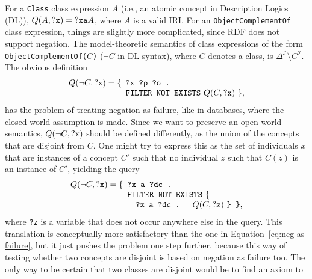 \documentclass[conference]{IEEEtran}
\begin{document}
For a \texttt{Class} class expression $A$ (i.e., an atomic concept in Description Logics (DL)), $Q(A, \mbox{\tt ?x}) = \mbox{\tt ?x a }A$,
where $A$ is a valid IRI.
For an \texttt{ObjectComplementOf} class expression, things are slightly more complicated, since RDF does not support
negation. The model-theoretic semantics of class expressions of the form \texttt{ObjectComplementOf(}$C$\texttt{)}
($\neg C$ in DL syntax), where $C$ denotes a class, is $\Delta^\mathcal{I} \setminus C^\mathcal{I}$.
The obvious definition
\begin{equation}\label{eq:neg-as-failure}
  Q(\neg C, \mbox{\tt ?x}) = 
  \begin{minipage}[t]{3in}
    \begin{tabbing}
      \quad\=\quad\=\quad\=\kill
      \{\>\texttt{?x ?p ?o .}\\
        \>\texttt{FILTER NOT EXISTS} $Q(C, \mbox{\tt ?x})$ \},
    \end{tabbing}
  \end{minipage}
\end{equation}
has the problem of treating negation as failure, like in databases,
where the closed-world assumption is made. 
Since we want to preserve an open-world semantics, $Q(\neg C, \mbox{\tt ?x})$ should be defined
differently, as the union of the concepts that are disjoint from $C$.
One might try to express this as the set of individuals $x$ that are instances of a
concept $C'$ such that no individual $z$ such that $C(z)$ is an instance of $C'$,
yielding the query
\begin{equation}\label{eq:approx-open-world-negation}
  Q(\neg C, \mbox{\tt ?x}) =
  \begin{minipage}[t]{3in}
    \begin{tabbing}
      \quad\=\quad\=\quad\=\kill
      \{\>\texttt{?x a ?dc .}\\
        \>\texttt{FILTER NOT EXISTS} \{\\
        \>\>\texttt{?z a ?dc . } $Q(C, \mbox{\tt ?z})$ \texttt{\} \}},
    \end{tabbing}
  \end{minipage}
\end{equation}
where \texttt{?z} is a variable that does not occur anywhere else in the query.
This translation is conceptually more satisfactory than the one in Equation~\ref{eq:neg-as-failure},
but it just pushes the problem one step further, because this way of testing whether
two concepts are disjoint is based on negation as failure too.
The only way to be certain that two classes are disjoint would be to find an axiom to
\end{document}
